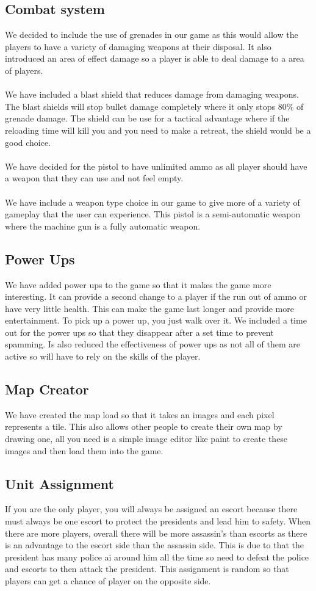 \documentclass[12pt]{article}
\newcommand{\return}{\\\\\noindent}
\begin{document}
\subsection{Combat system}
We decided to include the use of grenades in our game as this would allow the players to have a variety of damaging weapons at their disposal. It also introduced an area of effect damage so a player is able to deal damage to a area of players.\return
We have included a blast shield that reduces damage from damaging weapons. The blast shields will stop bullet damage completely where it only stops 80\% of grenade damage. The shield can be use for a tactical advantage where if the reloading time will kill you and you need to make a retreat, the shield would be a good choice.\return
We have decided for the pistol to have unlimited ammo as all player should have a weapon that they can use and not feel empty.\return
We have include a weapon type choice in our game to give more of a variety of gameplay that the user can experience. This pistol is a semi-automatic weapon where the machine gun is a fully automatic weapon.
\subsection{Power Ups}
We have added power ups to the game so that it makes the game more interesting. It can provide a second change to a player if the run out of ammo or have very little health. This can make the game last longer and provide more entertainment. To pick up a power up, you just walk over it. We included a time out for the power ups so that they disappear after a set time to prevent spamming. Is also reduced the effectiveness of power ups as not all of them are active so will have to rely on the skills of the player.
\subsection{Map Creator}
We have created the map load so that it takes an images and each pixel represents a tile. This also allows other people to create their own map by drawing one, all you need is a simple image editor like paint to create these images and then load them into the game.
\subsection{Unit Assignment}
If you are the only player, you will always be assigned an escort because there must always be one escort to protect the presidents and lead him to safety. When there are more players, overall there will be more assassin's than escorts as there is an advantage to the escort side than the assassin side. This is due to that the president has many police ai around him all the time so need to defeat the police and escorts to then attack the president. This assignment is random so that players can get a chance of player on the opposite side.
\end{document}
